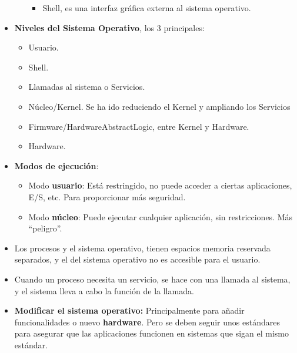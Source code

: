 \documentclass[12pt, twoside, openright]{report} %
\begin{document}
\begin{itemize}
\begin{itemize}
      \begin{itemize}
      \item Shell, es una interfaz gráfica externa al sistema operativo.
        
      \end{itemize}
    \end{itemize}
  \item \textbf{Niveles del Sistema Operativo}, los 3 principales:
    

    \begin{itemize}
    \item Usuario.
      
    \item Shell.
      
    \item Llamadas al sistema o Servicios.
      
    \item Núcleo/Kernel. Se ha ido reduciendo el Kernel y ampliando los
      Servicios
      
    \item Firmware/HardwareAbstractLogic, entre Kernel y Hardware.
      
    \item Hardware.
      
    \end{itemize}
  \item \textbf{Modos de ejecución}:
    

    \begin{itemize}
    \item Modo \textbf{usuario}: Está restringido, no puede acceder a
      ciertas aplicaciones, E/S, etc. Para proporcionar más seguridad.
      
    \item Modo \textbf{núcleo}: Puede ejecutar cualquier aplicación, sin
      restricciones. Más \enquote{peligro}.
      
    \end{itemize}
  \item Los procesos y el sistema operativo, tienen espacios memoria
    reservada separados, y el del sistema operativo no es accesible para
    el usuario.
    
  \item Cuando un proceso necesita un servicio, se hace con una llamada al
    sistema, y el sistema lleva a cabo la función de la llamada.
    
  \item \textbf{Modificar el sistema operativo:} Principalmente para añadir
    funcionalidades o nuevo \textbf{hardware}. Pero se deben seguir unos
    estándares para asegurar que las aplicaciones funcionen en sistemas
    que sigan el mismo estándar.
    
  \end{itemize}
  
\end{document}
